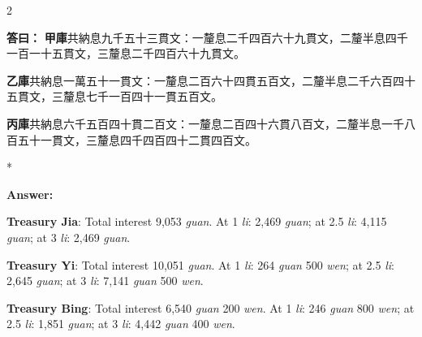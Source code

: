 \documentclass[11pt,a4paper]{article}
\newcommand{\CnAnswer}[1]{\par\noindent\textbf{\color{answercolor}答曰：}#1\par\vspace{0.5ex}}
\newcommand{\EnAnswer}{\par\noindent\textbf{\color{answercolor}Answer:}\par\vspace{0.5ex}}
\newcommand{\switchEn}{\switchcolumn[1]*}
\begin{document}
\begin{paracol}{2}

\CnAnswer{%
\textbf{甲庫}共納息九千五十三貫文：一釐息二千四百六十九貫文，二釐半息四千一百一十五貫文，三釐息二千四百六十九貫文。

\textbf{乙庫}共納息一萬五十一貫文：一釐息二百六十四貫五百文，二釐半息二千六百四十五貫文，三釐息七千一百四十一貫五百文。

\textbf{丙庫}共納息六千五百四十貫二百文：一釐息二百四十六貫八百文，二釐半息一千八百五十一貫文，三釐息四千四百四十二貫四百文。
}

\switchEn

\EnAnswer
\textbf{Treasury Jia}: Total interest 9,053 \textit{guan}. At 1 \textit{li}: 2,469 \textit{guan}; at 2.5 \textit{li}: 4,115 \textit{guan}; at 3 \textit{li}: 2,469 \textit{guan}.

\textbf{Treasury Yi}: Total interest 10,051 \textit{guan}. At 1 \textit{li}: 264 \textit{guan} 500 \textit{wen}; at 2.5 \textit{li}: 2,645 \textit{guan}; at 3 \textit{li}: 7,141 \textit{guan} 500 \textit{wen}.

\textbf{Treasury Bing}: Total interest 6,540 \textit{guan} 200 \textit{wen}. At 1 \textit{li}: 246 \textit{guan} 800 \textit{wen}; at 2.5 \textit{li}: 1,851 \textit{guan}; at 3 \textit{li}: 4,442 \textit{guan} 400 \textit{wen}.

\end{paracol}
\end{document}
